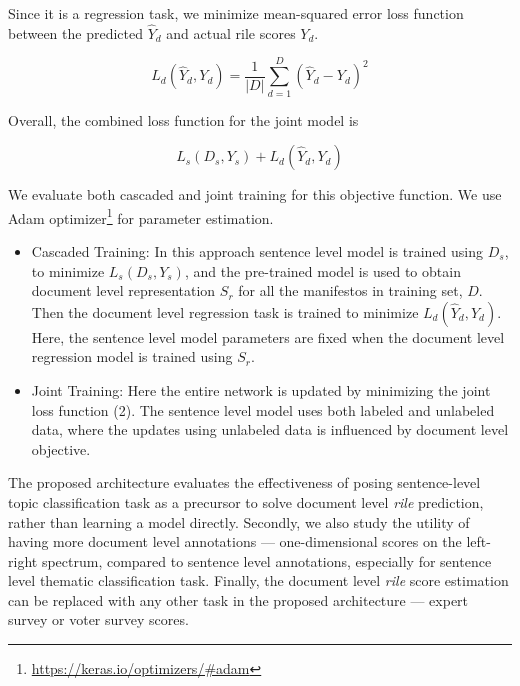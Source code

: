 \documentclass[11pt,a4paper]{article}
\begin{document}
Since it is a regression task, we minimize mean-squared error loss function between the predicted $\hat{Y}_{d}$ and actual rile scores $Y_{d}$.

\[ L_{d}(\hat{Y}_{d}, Y_{d}) = \frac{1}{|D|} \sum_{d=1}^{D} (\hat{Y}_{d} - Y_{d})^2 \]

Overall, the combined loss function for the joint model is 

\begin{equation}
 L_{s}(D_{s},Y_{s}) + L_{d}(\hat{Y}_{d}, Y_{d}) 
\end{equation}

We evaluate both cascaded and joint training for this objective function. We use Adam optimizer\footnote{\url{https://keras.io/optimizers/\#adam}} for parameter estimation. 
\begin{itemize}
\item{Cascaded Training:} In this approach sentence level model is trained using $D_{s}$, to minimize $L_{s}(D_{s},Y_{s})$, and the pre-trained model is used to obtain document level representation $S_{r}$ for all the manifestos in training set, $D$. Then the document level regression task is trained to minimize $L_{d}(\hat{Y}_{d}, Y_{d})$. Here, the sentence level model parameters are fixed when the document level regression model is trained using $S_{r}$.

\item{Joint Training:} Here the entire network is updated by minimizing the joint loss function (2). The sentence level model uses both labeled and unlabeled data, where the updates using unlabeled data is influenced by document level objective.
\end{itemize}


The proposed architecture evaluates the effectiveness of posing sentence-level topic classification task as a precursor to solve document level \textit{rile} prediction, rather than learning a model directly. Secondly, we also study the utility of having more document level annotations --- one-dimensional scores on the left-right spectrum, compared to sentence level annotations, especially for sentence level thematic classification task. Finally, the document level \textit{rile} score estimation can be replaced with any other task in the proposed architecture --- expert survey or voter survey scores.
\end{document}
